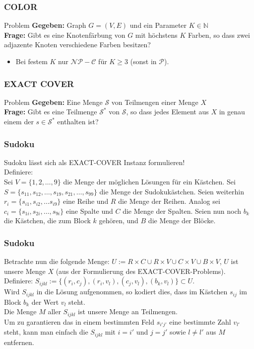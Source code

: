 \documentclass{beamer}
\begin{document}
\begin{frame}
\frametitle{COLOR}
\begin{block}{Problem}
\textbf{Gegeben:} Graph $G = (V, E)$ und ein Parameter $K \in \mathbb{N}$\\
\textbf{Frage:} Gibt es eine Knotenfärbung von $G$ mit höchstens $K$ Farben, so dass zwei adjazente Knoten verschiedene Farben besitzen?
\end{block}
\begin{itemize}
\item Bei festem $K$ nur $\mathcal{NP-C}$ für $K \geq 3$ (sonst in $\mathcal{P}$).
\end{itemize}
\end{frame}
\begin{frame}
\frametitle{EXACT COVER}
\begin{block}{Problem}
\textbf{Gegeben:} Eine Menge $\mathcal{S}$ von Teilmengen einer Menge $X$\\
\textbf{Frage:} Gibt es eine Teilmenge $\mathcal{S}^*$ von $\mathcal{S}$, so dass jedes Element aus $X$ in genau einem der $s \in \mathcal{S}^*$ enthalten ist?
\end{block}
\end{frame}

\begin{frame}
\frametitle{Sudoku}
Sudoku lässt sich als EXACT-COVER Instanz formulieren!\\
Definiere:\\
Sei $V = \{1,2,\ldots,9\}$ die Menge der möglichen Lösungen für ein Kästchen.
Sei $S = \{s_{11}, s_{12},\ldots,s_{19},s_{21},\ldots,s_{99}\}$ die Menge der Sudokukästchen.
Seien weiterhin $r_i = \{s_{i1}, s_{i2}, \ldots s_{i9}\}$ eine Reihe und $R$ die Menge der Reihen.
Analog sei $c_i = \{s_{1i}, s_{2i}, \ldots, s_{9i}\}$ eine Spalte und $C$ die Menge der Spalten.
Seien nun noch $b_k$ die Kästchen, die zum Block $k$ gehören, und $B$ die Menge der Blöcke.
\end{frame}

\begin{frame}
\frametitle{Sudoku}
Betrachte nun die folgende Menge: $U := R \times C \cup R \times V \cup C \times V \cup B \times V$, $U$ ist unsere Menge $X$ (aus der Formulierung des EXACT-COVER-Problems).\\
Definiere: $S_{ijkl} := \{(r_i,c_j),(r_i,v_l),(c_j,v_l),(b_k,v_l)\} \subset U$.\\[8pt]
Wird $S_{ijkl}$ in die Lösung aufgenommen, so kodiert dies, dass im Kästchen $s_{ij}$ im Block $b_k$ der Wert $v_l$ steht.\\
Die Menge $M$ aller $S_{ijkl}$ ist unsere Menge an Teilmengen.\\
Um zu garantieren das in einem bestimmten Feld $s_{i'j'}$ eine bestimmte Zahl $v_{l'}$ steht, kann man einfach die $S_{ijkl}$ mit $i = i'$ und $j = j'$ sowie $l \neq l'$ aus $M$ entfernen.
\end{frame}
\end{document}
